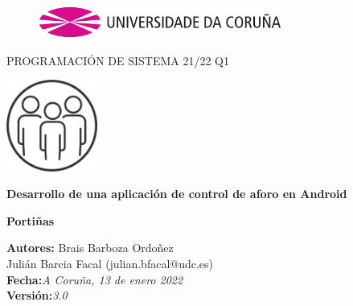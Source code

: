 \documentclass[a4paper,openright,12pt]{article}
\begin{document}
\begin{titlepage}

\begin{center}
\vspace*{-1in}
\begin{figure}[htb]
\begin{center}
\includegraphics[width=8cm]{udc.eps}
\end{center}
\end{figure}

\vspace*{1in}
PROGRAMACIÓN DE SISTEMA 21/22 Q1\\
\begin{center}
\includegraphics[width=3cm,height=3cm]{ejemplo.jpg}
\end{center}
\vspace*{10mm}
\begin{Large}
\textbf{Desarrollo de una aplicación de control de aforo en Android} \\
\end{Large}
\vspace*{10mm}
\begin{Large}
\textbf{Portiñas} \\
\end{Large}

\vspace*{3in}
\begin{large}
\raggedleft
\textbf{Autores:} Brais Barboza Ordoñez\\
Julián Barcia Facal (julian.bfacal@udc.es) \\
\textbf{Fecha:}\textit{A Coruña, 13 de enero 2022}\\
\textbf{Versión:}\textit{3.0}\\

\end{large}

\end{center}
\end{titlepage} 

\newpage
\end{document}
